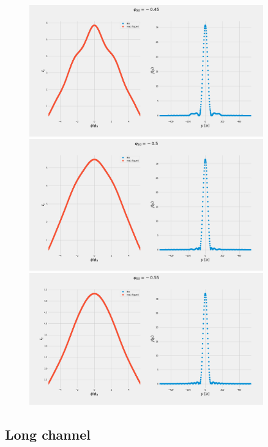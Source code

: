 \documentclass[a4paper]{article}
\begin{document}
\begin{figure}
	\includegraphics[width=0.9\textwidth]{figs/wg32/current_and_density_045}
	\includegraphics[width=0.9\textwidth]{figs/wg32/current_and_density_05}
	\includegraphics[width=0.9\textwidth]{figs/wg32/current_and_density_055}
\end{figure}
\FloatBarrier
\subsection{Long channel}
\end{document}
